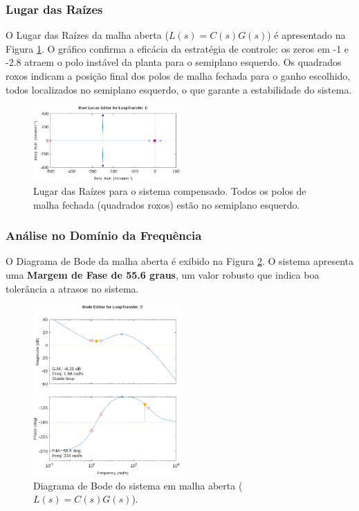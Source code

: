 \subsubsection{Lugar das Raízes}

O Lugar das Raízes da malha aberta ($L(s) = C(s)G(s)$) é apresentado na Figura \ref{fig:root_locus}. O gráfico confirma a eficácia da estratégia de controle: os zeros em -1 e -2.8 atraem o polo instável da planta para o semiplano esquerdo. Os quadrados roxos indicam a posição final dos polos de malha fechada para o ganho escolhido, todos localizados no semiplano esquerdo, o que garante a estabilidade do sistema.

\begin{figure}[ht!]
    \centering
    \includegraphics[width=0.5\textwidth]{root_locus.png}
    \caption{Lugar das Raízes para o sistema compensado. Todos os polos de malha fechada (quadrados roxos) estão no semiplano esquerdo.}
    \label{fig:root_locus}
\end{figure}
\newpage

\subsubsection{Análise no Domínio da Frequência}

O Diagrama de Bode da malha aberta é exibido na Figura \ref{fig:bode_loop}. O sistema apresenta uma \textbf{Margem de Fase de 55.6 graus}, um valor robusto que indica boa tolerância a atrasos no sistema.

\begin{figure}[ht!]
    \centering
    \includegraphics[width=0.5\textwidth]{bode.png}
    \caption{Diagrama de Bode do sistema em malha aberta ($L(s)=C(s)G(s)$).}
    \label{fig:bode_loop}
\end{figure}

